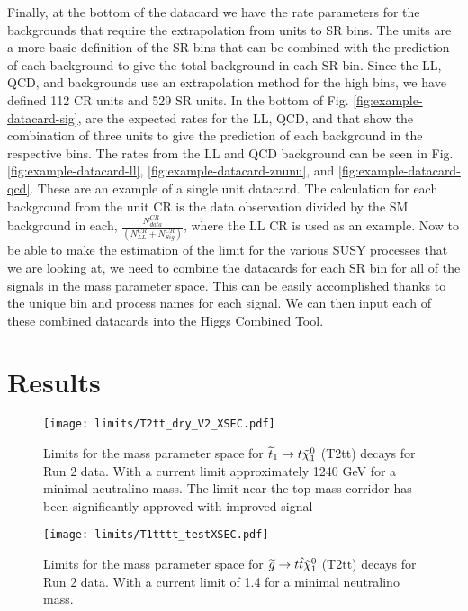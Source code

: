 Finally, at the bottom of the datacard we have the rate parameters for the backgrounds that require the extrapolation from units to SR bins. The units are a more basic definition of the SR bins that can be combined with the prediction of each background to give the total background in each SR bin. Since the LL, QCD, and \Znunu{} backgrounds use an extrapolation method for the high \dm{} bins, we have defined 112 CR units and 529 SR units. In the bottom of Fig. \ref{fig:example-datacard-sig}, are the expected rates for the LL, QCD, and \Znunu{} that show the combination of three units to give the prediction of each background in the respective bins. The rates from the LL and QCD background can be seen in Fig. \ref{fig:example-datacard-ll}, \ref{fig:example-datacard-znunu}, and  \ref{fig:example-datacard-qcd}. These are an example of a single unit datacard. The calculation for each background from the unit CR is the data observation divided by the SM background in each, $\frac{N_{data}^{CR}}{(N_{LL}^{CR} + N_{Sig}^{CR})}$, where the LL CR is used as an example. Now to be able to make the estimation of the limit for the various SUSY processes that we are looking at, we need to combine the datacards for each SR bin for all of the signals in the mass parameter space. This can be easily accomplished thanks to the unique bin and process names for each signal. We can then input each of these combined datacards into the Higgs Combined Tool.

\section{Results}\label{sec:Results}

\begin{figure}
	\begin{center}
  \texttt{[image: limits/T2tt\_dry\_V2\_XSEC.pdf]}
	\end{center}
	\caption[Run 2: T2tt Limits]{Limits for the mass parameter space for $\widetilde{t}_1\rightarrow t \tilde{\chi}^{0}_{1}$ (T2tt) decays for Run 2 data. With a current limit approximately 1240 GeV for a minimal neutralino mass. The limit near the top mass corridor has been significantly approved with improved signal 
	 }
	\label{fig:Run2-T2tt-limits}
\end{figure}

\begin{figure}
	\begin{center}
  \texttt{[image: limits/T1tttt\_testXSEC.pdf]}
	\end{center}
	\caption[Run 2: T2tt Limits]{Limits for the mass parameter space for $\widetilde{g}\rightarrow t\hat{t}\tilde{\chi}^{0}_{1}$ (T2tt) decays for Run 2 data. With a current limit of 1.4 \TeV{} for a minimal neutralino mass.
	 }
	\label{fig:Run2-T1tttt-limits}
\end{figure}

